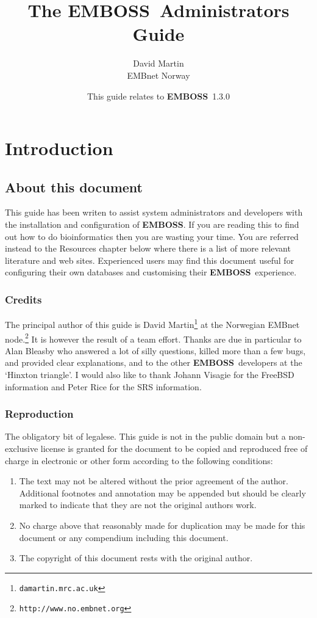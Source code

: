 \documentclass{report}
\newcommand{\URL}[1]{\footnote{{\tt #1}}}
\newcommand{\EMBOSS}{{\sf\bfseries EMBOSS}}
\begin{document}
\title{The \EMBOSS\ Administrators Guide}
\author{David Martin \\ EMBnet Norway}
\date{This guide relates to \EMBOSS\ 1.3.0}

\maketitle
\tableofcontents

\chapter{Introduction}
\section{About this document}
This guide has been writen to assist system administrators and developers with the installation and configuration of \EMBOSS. If you are reading this to find out how to do bioinformatics then you are wasting your time. You are referred instead to the Resources chapter below where there is a list of more relevant literature and web sites. 
Experienced users may find this document useful for configuring their own databases and customising their \EMBOSS\ experience.


\subsection{Credits}
The principal author of this guide is David Martin\URL{damartin\@@hgmp.mrc.ac.uk} at the Norwegian EMBnet node.\URL{http://www.no.embnet.org} It is however the result of a team effort. Thanks are due in particular to Alan Bleasby who answered a lot of silly questions, killed more than a few bugs, and provided clear explanations, and to the other \EMBOSS\ developers at the `Hinxton triangle'. I would also like to thank Johann Visagie for the FreeBSD information and Peter Rice for the SRS information. 

\subsection{Reproduction}
The obligatory bit of legalese. This guide is not in the public domain but a non-exclusive license is granted for the document to be copied and reproduced free of charge in electronic or other form according to the following conditions:
\begin{enumerate}
\item The text may not be altered without the prior agreement of the author. Additional footnotes and annotation may be appended but should be clearly marked to indicate that they are not the original authors work.
\item No charge above that reasonably made for duplication may be made for this document or any compendium including this document.
\item The copyright of this document rests with the original author.
\end{enumerate}
\end{document}
